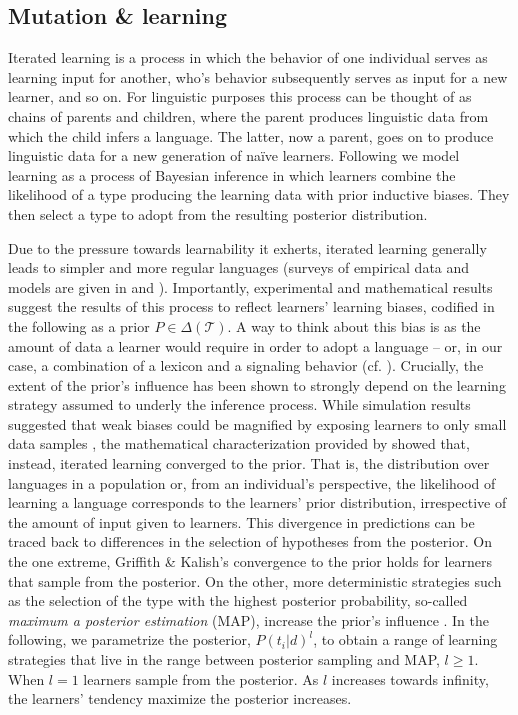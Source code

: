 \documentclass[a4paper]{article}
\begin{document}
\subsection{Mutation \& learning}
Iterated learning is a process in which the behavior of one individual serves as learning input for another, who's behavior subsequently serves as input for a new learner, and so on. For linguistic purposes this process can be thought of as chains of parents and children, where the parent produces linguistic data from which the child infers a language. The latter, now a parent, goes on to produce linguistic data for a new generation of na\"ive learners. Following \citet{griffiths+kalish:2007} we model learning as a process of Bayesian inference in which learners combine the likelihood of a type producing the learning data with prior inductive biases. They then select a type to adopt from the resulting posterior distribution.

Due to the pressure towards learnability it exherts, iterated learning generally leads to simpler and more regular languages (surveys of empirical data and models are given in \citealt{kirby+etal:2014} and \citealt{tamariz+kirby:2016}). Importantly, experimental and mathematical results suggest the results of this process to reflect learners' learning biases, codified in the following as a prior $P \in \Delta(\mathcal{T})$. A way to think about this bias is as the amount of data a learner would require in order to adopt a language -- or, in our case, a combination of a lexicon and a signaling behavior (cf. \citealt[450]{griffiths+kalish:2007}). Crucially, the extent of the prior's influence has been shown to strongly depend on the learning strategy assumed to underly the inference process. While simulation results suggested that weak biases could be magnified by exposing learners to only small data samples \citep{brighton:2002}, the mathematical characterization provided by \citet{griffiths+kalish:2007} showed that, instead, iterated learning converged to the prior. That is, the distribution over languages in a population or, from an individual's perspective, the likelihood of learning a language corresponds to the learners' prior distribution, irrespective of the amount of input given to learners. This divergence in predictions can be traced back to differences in the selection of hypotheses from the posterior. On the one extreme, Griffith \& Kalish's convergence to the prior holds for learners that sample from the posterior. On the other, more deterministic strategies such as the selection of the type with the highest posterior probability, so-called {\it maximum a posterior estimation} (MAP), increase the prior's influence \citep{griffiths+kalish:2007,kirby+etal:2007}. In the following, we parametrize the posterior, $P(t_i|d)^l$, to obtain a range of learning strategies that live in the range between posterior sampling and MAP, $l \geq 1$. When $l = 1$ learners sample from the posterior. As $l$ increases towards infinity, the learners' tendency maximize the posterior increases. 
\end{document}
